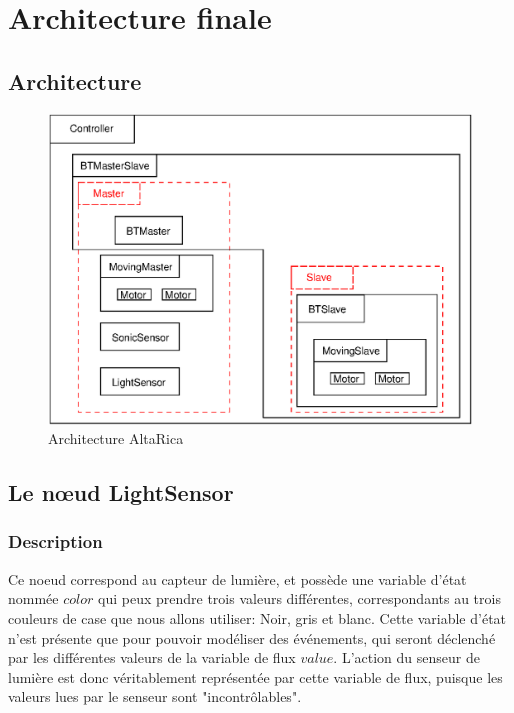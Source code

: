  \section{Architecture finale}

  \subsection{Architecture}
  \begin{figure}[!ht]
   \begin{center}
    \includegraphics{ARmodel.eps}
    \caption{Architecture AltaRica}
   \end{center}
  \end{figure}

  \subsection{Le n\oe{}ud LightSensor}

   \subsubsection{Description}
   Ce noeud correspond au capteur de lumière, et possède une variable
   d'état nommée $color$ qui   peux prendre trois valeurs différentes,
   correspondants au trois couleurs de case que nous allons utiliser:
   Noir, gris et blanc. Cette variable d'état n'est présente que pour
   pouvoir modéliser des événements, qui seront déclenché par les
   différentes valeurs de la variable de flux $value$. L'action du
   senseur de lumière est donc véritablement représentée par cette
   variable de flux, puisque les valeurs lues par le senseur sont
   "incontrôlables".

